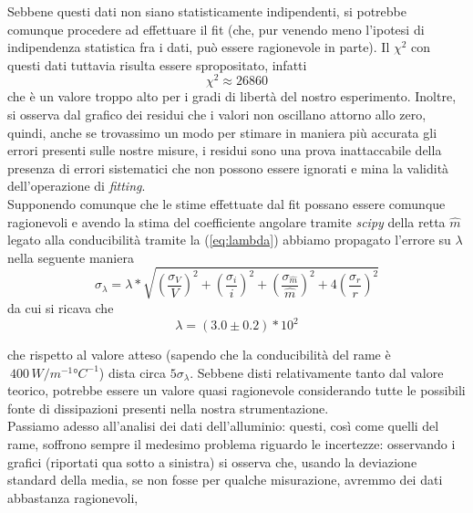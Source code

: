 \documentclass{article}
\begin{document}
Sebbene questi dati non siano statisticamente indipendenti, si potrebbe comunque procedere ad effettuare il fit (che, pur venendo meno l'ipotesi di indipendenza statistica fra i dati, può essere ragionevole in parte). Il $\chi^2$ con questi dati tuttavia risulta essere spropositato, infatti
\begin{equation*}
	\chi^2 \approx 26860
\end{equation*}
che è un valore troppo alto per i gradi di libertà del nostro esperimento. Inoltre, si osserva dal grafico dei residui che i valori non oscillano attorno allo zero, quindi, anche se trovassimo un modo per stimare in maniera più accurata gli errori presenti sulle nostre misure, i residui sono una prova inattaccabile della presenza di errori sistematici che non possono essere ignorati e mina la validità dell'operazione di \emph{fitting}. \\
Supponendo comunque che le stime effettuate dal fit possano essere comunque ragionevoli e avendo la stima del coefficiente angolare tramite \emph{scipy} della retta $\hat{m}$ legato alla conducibilità tramite la (\ref{eq:lambda}) abbiamo propagato l'errore su $\lambda$ nella seguente maniera
\begin{equation*}
	\sigma_\lambda = \lambda * \sqrt{ \left( \frac{\sigma_V}{V} \right)^2 + \left( \frac{\sigma_i}{i} \right)^2 + \left( \frac{\sigma_{\hat{m}}}{\hat{m}} \right)^2 + 4 \left(\frac{\sigma_r}{r} \right)^2} 
\end{equation*}
da cui si ricava che
\begin{equation*}
	\lambda = (3.0 \pm 0.2) * 10^2
\end{equation*}
\clearpage

che rispetto al valore atteso (sapendo che la conducibilità del rame è $~400 \, \unit{W/m^{-1}°C^{-1}}$) dista circa $5\sigma_{\lambda}$. Sebbene disti relativamente tanto dal valore teorico, potrebbe essere un valore quasi ragionevole considerando tutte le possibili fonte di dissipazioni presenti nella nostra strumentazione. \\
Passiamo adesso all'analisi dei dati dell'alluminio: questi, così come quelli del rame, soffrono sempre il medesimo problema riguardo le incertezze: osservando i grafici (riportati qua sotto a sinistra) si osserva che, usando la deviazione standard della media, se non fosse per qualche misurazione, avremmo dei dati abbastanza ragionevoli, 
\end{document}
